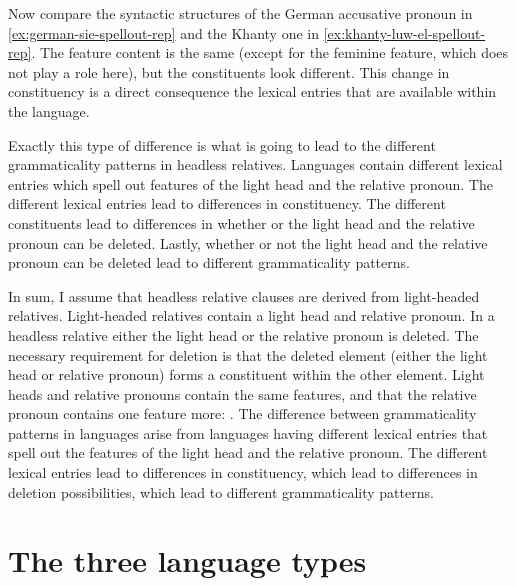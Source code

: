 Now compare the syntactic structures of the German accusative pronoun in \ref{ex:german-sie-spellout-rep} and the Khanty one in \ref{ex:khanty-luw-el-spellout-rep}. The feature content is the same (except for the feminine feature, which does not play a role here), but the constituents look different.
This change in constituency is a direct consequence the lexical entries that are available within the language.

Exactly this type of difference is what is going to lead to the different grammaticality patterns in headless relatives. Languages contain different lexical entries which spell out features of the light head and the relative pronoun.
The different lexical entries lead to differences in constituency. The different constituents lead to differences in whether or the light head and the relative pronoun can be deleted. Lastly, whether or not the light head and the relative pronoun can be deleted lead to different grammaticality patterns.

In sum, I assume that headless relative clauses are derived from light-headed relatives. Light-headed relatives contain a light head and relative pronoun. In a headless relative either the light head or the relative pronoun is deleted.
The necessary requirement for deletion is that the deleted element (either the light head or relative pronoun) forms a constituent within the other element.
Light heads and relative pronouns contain the same features, and that the relative pronoun contains one feature more: .
The difference between grammaticality patterns in languages arise from languages having different lexical entries that spell out the features of the light head and the relative pronoun. The different lexical entries lead to differences in constituency, which lead to differences in deletion possibilities, which lead to different grammaticality patterns.




\section{The three language types}\label{sec:three-types}

